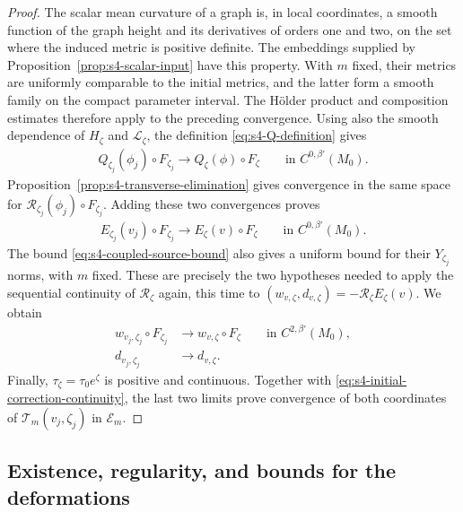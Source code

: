 \documentclass[a4paper,11pt,oneside,reqno]{amsart}
\numberwithin{equation}{section}
\theoremstyle{definition}
\begin{document}
\begin{proof}
    The scalar mean curvature of a graph is, in local
    coordinates, a smooth function of the graph height and
    its derivatives of orders one and two, on the set where
    the induced metric is positive definite. The embeddings
    supplied by Proposition~\ref{prop:s4-scalar-input} have
    this property. With $m$ fixed, their metrics are uniformly
    comparable to the initial metrics, and the latter form
    a smooth family on the compact parameter interval.
    The H\"older product and composition estimates therefore
    apply to the preceding convergence. Using also the
    smooth dependence of $H_\zeta$ and $\mathcal L_\zeta$,
    the definition \eqref{eq:s4-Q-definition} gives
    \begin{align*}
        Q_{\zeta_j}(\phi_j)\circ F_{\zeta_j}
        \rightarrow Q_\zeta(\phi)\circ F_\zeta
        \qquad\text{in }C^{0,\beta'}(M_0).
    \end{align*}
    Proposition~\ref{prop:s4-transverse-elimination} gives
    convergence in the same space for
    $\mathcal R_{\zeta_j}(\phi_j)\circ F_{\zeta_j}$.
    Adding these two convergences proves
    \begin{align}
        \label{eq:s4-coupled-source-continuity}
        E_{\zeta_j}(v_j)\circ F_{\zeta_j}
        \rightarrow E_\zeta(v)\circ F_\zeta
        \qquad\text{in }C^{0,\beta'}(M_0).
    \end{align}
    The bound \eqref{eq:s4-coupled-source-bound} also gives
    a uniform bound for their $Y_{\zeta_j}$ norms, with $m$
    fixed. These are precisely the two hypotheses needed
    to apply the sequential continuity of $\mathscr R_\zeta$
    again, this time to
    $(w_{v,\zeta},d_{v,\zeta})=-\mathscr R_\zeta E_\zeta(v)$.
    We obtain
    \begin{align*}
        w_{v_j,\zeta_j}\circ F_{\zeta_j}
        &\rightarrow w_{v,\zeta}\circ F_\zeta
        \qquad\text{in }C^{2,\beta'}(M_0),\\
        d_{v_j,\zeta_j}&\rightarrow d_{v,\zeta}.
    \end{align*}
    Finally, $\tau_\zeta=\tau_0e^\zeta$ is positive and
    continuous. Together with
    \eqref{eq:s4-initial-correction-continuity}, the last two
    limits prove convergence of both coordinates of
    $\mathcal T_m(v_j,\zeta_j)$ in $\mathcal E_m$.
\end{proof}

\subsection{Existence, regularity, and bounds for the deformations}
\end{document}
